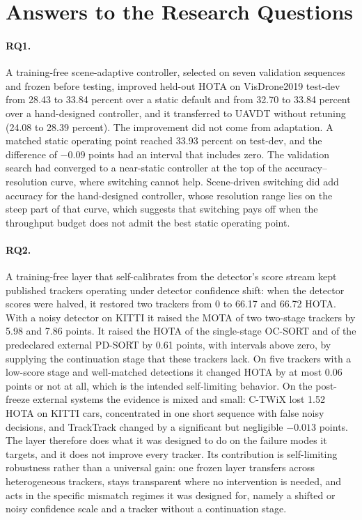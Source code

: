 \section{Answers to the Research Questions}\label{sec:c-answers}

\paragraph{RQ1.} A training-free scene-adaptive controller, selected on seven validation sequences and frozen before testing, improved held-out HOTA on VisDrone2019 test-dev from 28.43 to 33.84 percent over a static default and from 32.70 to 33.84 percent over a hand-designed controller, and it transferred to UAVDT without retuning (24.08 to 28.39 percent). The improvement did not come from adaptation. A matched static operating point reached 33.93 percent on test-dev, and the difference of $-0.09$ points had an interval that includes zero. The validation search had converged to a near-static controller at the top of the accuracy--resolution curve, where switching cannot help. Scene-driven switching did add accuracy for the hand-designed controller, whose resolution range lies on the steep part of that curve, which suggests that switching pays off when the throughput budget does not admit the best static operating point.

\paragraph{RQ2.} A training-free layer that self-calibrates from the detector's score stream kept published trackers operating under detector confidence shift: when the detector scores were halved, it restored two trackers from 0 to 66.17 and 66.72 HOTA. With a noisy detector on KITTI it raised the MOTA of two two-stage trackers by 5.98 and 7.86 points. It raised the HOTA of the single-stage OC-SORT and of the predeclared external PD-SORT by 0.61 points, with intervals above zero, by supplying the continuation stage that these trackers lack. On five trackers with a low-score stage and well-matched detections it changed HOTA by at most 0.06 points or not at all, which is the intended self-limiting behavior. On the post-freeze external systems the evidence is mixed and small: C-TWiX lost 1.52 HOTA on KITTI cars, concentrated in one short sequence with false noisy decisions, and TrackTrack changed by a significant but negligible $-0.013$ points. The layer therefore does what it was designed to do on the failure modes it targets, and it does not improve every tracker. Its contribution is self-limiting robustness rather than a universal gain: one frozen layer transfers across heterogeneous trackers, stays transparent where no intervention is needed, and acts in the specific mismatch regimes it was designed for, namely a shifted or noisy confidence scale and a tracker without a continuation stage.

